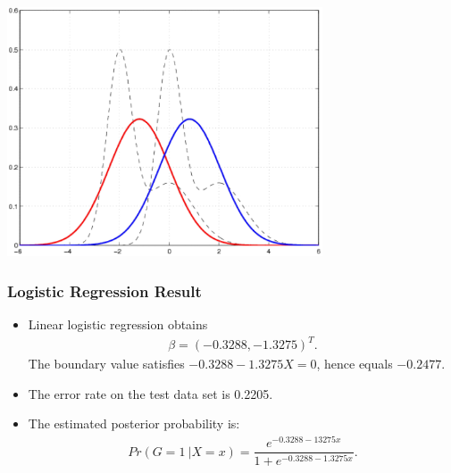 \documentclass[12pt,notes,mathserif]{beamer}
\begin{document}
\begin{frame}[c]
	\frametitle{}
	\begin{center}
		\includegraphics[width=0.7\textwidth]{lec12-42.jpg}
	\end{center}
\end{frame}

\begin{frame}[c]
	\frametitle{Logistic Regression Result}
	\begin{itemize}
		\item  Linear logistic regression obtains
		      \begin{gather*}
			      \beta=(-0.3288,-1.3275)^T.
		      \end{gather*}
		      The boundary value satisfies $−0.3288 − 1.3275X = 0$, hence equals $−0.2477$.

		\item The error rate on the test data set is 0.2205.

		\item  The estimated posterior probability is:
		      \begin{gather*}
			      Pr(G=1~|X=x)=\dfrac{e^{-0.3288-13275x}}{1+e^{-0.3288-1.3275x}}.
		      \end{gather*}
	\end{itemize}

\end{frame}
\end{document}
